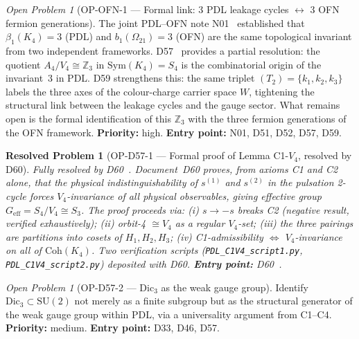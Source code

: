 \documentclass[11pt,a4paper]{article}
\newtheorem{resolvedproblem}{Resolved Problem}
\theoremstyle{plain}
\theoremstyle{definition}
\theoremstyle{remark}
\newtheorem{openproblem}[theorem]{Open Problem}
\newcommand{\Kfour}{K_4}
\begin{document}
\begin{openproblem}[OP-OFN-1 --- Formal link: 3 PDL leakage cycles $\leftrightarrow$ 3 OFN fermion generations]
\label{op:OFN1}
The joint PDL--OFN note N01~\cite{N01} established that $\beta_1(\Kfour)=3$ (PDL) and $b_1(\Omega_{21})=3$ (OFN) are the same topological invariant from two independent frameworks. D57~\cite{D57} provides a partial resolution: the quotient $A_4/V_4 \cong \mathbb{Z}_3$ in $\mathrm{Sym}(\Kfour)=S_4$ is the combinatorial origin of the invariant~3 in PDL. D59 strengthens this: the same triplet $(T_2) = \{k_1,k_2,k_3\}$ labels the three axes of the colour-charge carrier space $W$, tightening the structural link between the leakage cycles and the gauge sector. What remains open is the formal identification of this $\mathbb{Z}_3$ with the three fermion generations of the OFN framework. \textbf{Priority:} high. \textbf{Entry point:} N01, D51, D52, D57, D59.
\end{openproblem}

\begin{resolvedproblem}[OP-D57-1 --- Formal proof of Lemma C1-$V_4$, resolved by D60]
\label{op:C1V4}
\textcolor{proofblue}{Fully resolved by D60~\cite{D60}.} Document~D60 proves, from axioms C1 and C2 alone, that the physical indistinguishability of $s^{(1)}$ and $s^{(2)}$ in the pulsation 2-cycle forces $V_4$-invariance of all physical observables, giving effective group $G_{\mathrm{eff}} = S_4/V_4 \cong S_3$. The proof proceeds via: (i) $s \to -s$ breaks C2 (negative result, verified exhaustively); (ii) orbit-4 $\cong V_4$ as a regular $V_4$-set; (iii) the three pairings are partitions into cosets of $H_1, H_2, H_3$; (iv) C1-admissibility $\Leftrightarrow$ $V_4$-invariance on all of $\mathrm{Coh}(K_4)$. Two verification scripts (\texttt{PDL\_C1V4\_script1.py}, \texttt{PDL\_C1V4\_script2.py}) deposited with D60. \textbf{Entry point:} D60~\cite{D60}.
\end{resolvedproblem}

\begin{openproblem}[OP-D57-2 --- $\mathrm{Dic}_3$ as the weak gauge group]
\label{op:Dic3}
Identify $\mathrm{Dic}_3 \subset \mathrm{SU}(2)$ not merely as a finite subgroup but as the structural generator of the weak gauge group within PDL, via a universality argument from C1--C4. \textbf{Priority:} medium. \textbf{Entry point:} D33, D46, D57.
\end{openproblem}
\end{document}
